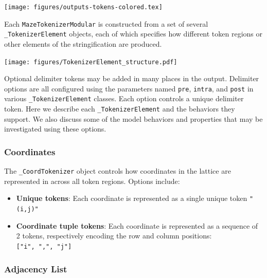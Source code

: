 \documentclass[10pt,a4paper,onecolumn]{article}
\let\origfigure\figure
\let\endorigfigure\endfigure
\renewenvironment{figure}[1][2] {
    \expandafter\origfigure\expandafter[H]
} {
    \endorigfigure
}
\providecommand{\tightlist}{%
  \setlength{\itemsep}{0pt}\setlength{\parskip}{0pt}}
\begin{document}
\begin{figure}
\centering
\texttt{[image: figures/outputs-tokens-colored.tex]}
\caption{Example text output format with token regions highlighted.}
\end{figure}

Each \texttt{MazeTokenizerModular} is constructed from a set of several
\texttt{\_TokenizerElement} objects, each of which specifies how
different token regions or other elements of the stringification are
produced.

\begin{figure}
\centering
\texttt{[image: figures/TokenizerElement\_structure.pdf]}
\caption{Nested internal structure of \texttt{\_TokenizerElement}
objects inside a typical \texttt{MazeTokenizerModular} object.}
\end{figure}

Optional delimiter tokens may be added in many places in the output.
Delimiter options are all configured using the parameters named
\texttt{pre}, \texttt{intra}, and \texttt{post} in various
\texttt{\_TokenizerElement} classes. Each option controls a unique
delimiter token. Here we describe each \texttt{\_TokenizerElement} and
the behaviors they support. We also discuss some of the model behaviors
and properties that may be investigated using these options.

\hypertarget{coordtokenizer}{%
\subsubsection{Coordinates}\label{coordtokenizer}}

The \texttt{\_CoordTokenizer} object controls how coordinates in the
lattice are represented in across all token regions. Options include:

\begin{itemize}
\tightlist
\item
  \textbf{Unique tokens}: Each coordinate is represented as a single
  unique token \texttt{"(i,j)"}
\item
  \textbf{Coordinate tuple tokens}: Each coordinate is represented as a
  sequence of 2 tokens, respectively encoding the row and column
  positions: \texttt{{[}"i",\ ",",\ "j"{]}}
\end{itemize}

\hypertarget{adjlisttokenizer}{%
\subsubsection{Adjacency List}\label{adjlisttokenizer}}
\end{document}
